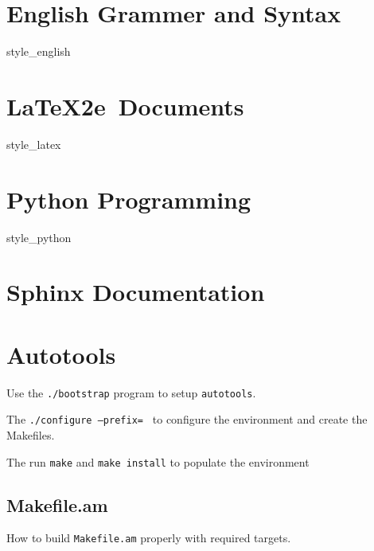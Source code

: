 \documentclass{book}
\begin{document}
\chapter{English Grammer and Syntax}
{style_english}


\chapter{\LaTeX2e\ Documents}
{style_latex}

\chapter{Python Programming}
{style_python}

\chapter{Sphinx Documentation}

\chapter{Autotools}
Use the \texttt{./bootstrap} program to setup \texttt{autotools}.

The \texttt{./configure --prefix=~} to configure the environment
and create the Makefiles.

The run \texttt{make} and \texttt{make install} to populate the
environment

\section{Makefile.am}

How to build \texttt{Makefile.am} properly with required targets.

\printbibliography
\end{document}

